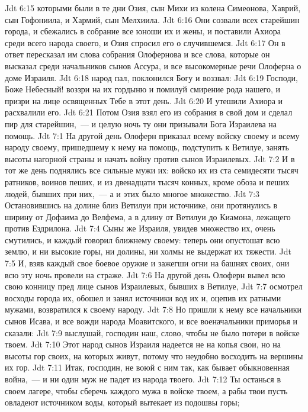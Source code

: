 \vs Jdt 6:15 которыми были в те дни Озия, сын Михи из колена Симеонова, Хаврий, сын Гофониила, и Хармий, сын Мелхиила.
\vs Jdt 6:16 Они созвали всех старейшин города, и сбежались в собрание все юноши их и жены, и поставили Ахиора среди всего народа своего, и Озия спросил его о случившемся.
\vs Jdt 6:17 Он в ответ пересказал им слова собрания Олофернова и все слова, которые он высказал среди начальников сынов Ассура, и все высокомерные речи Олоферна о доме Израиля.
\vs Jdt 6:18  народ пал, поклонился Богу и воззвал:
\vs Jdt 6:19 Господи, Боже Небесный! воззри на их гордыню и помилуй смирение рода нашего, и призри на лице освященных Тебе в этот день.
\vs Jdt 6:20 И утешили Ахиора и расхвалили его.
\vs Jdt 6:21 Потом Озия взял его из собрания в свой дом и сделал пир для старейшин,~--- и целую ночь ту они призывали Бога Израилева на помощь.
\vs Jdt 7:1 На другой день Олоферн приказал всему войску своему и всему народу своему, пришедшему к нему на помощь, подступить к Ветилуе, занять высоты нагорной страны и начать войну против сынов Израилевых.
\vs Jdt 7:2 И в тот же день поднялись все сильные мужи их: войско их  из ста семидесяти тысяч ратников, воинов пеших, и из двенадцати тысяч конных, кроме обоза и пеших людей, бывших при них,~--- а и этих было многое множество.
\vs Jdt 7:3 Остановившись на долине близ Ветилуи при источнике, они протянулись в ширину от Дофаима до Велфема, а в длину от Ветилуи до Киамона, лежащего против Ездрилона.
\vs Jdt 7:4 Сыны же Израиля, увидев множество их, очень смутились, и каждый говорил ближнему своему: теперь они опустошат всю землю, и ни высокие горы, ни долины, ни холмы не выдержат их тяжести.
\vs Jdt 7:5 И, взяв каждый свое боевое оружие и зажегши огни на башнях своих, они всю эту ночь провели на страже.
\rsbpar\vs Jdt 7:6 На другой день Олоферн вывел всю свою конницу пред лице сынов Израилевых, бывших в Ветилуе,
\vs Jdt 7:7 осмотрел восходы города их, обошел и занял источники вод их и, оцепив их ратными мужами, возвратился к своему народу.
\vs Jdt 7:8 Но пришли к нему все начальники сынов Исава, и все вожди народа Моавитского, и все военачальники приморья и сказали:
\vs Jdt 7:9 выслушай, господин наш, слово, чтобы не было потери в войске твоем.
\vs Jdt 7:10 Этот народ сынов Израиля надеется не на копья свои, но на высоты гор своих, на которых живут, потому что неудобно восходить на вершины их гор.
\vs Jdt 7:11 Итак, господин, не воюй с ним так, как бывает обыкновенная война,~--- и ни один муж не падет из народа твоего.
\vs Jdt 7:12 Ты останься в своем лагере, чтобы сберечь каждого мужа в войске твоем, а рабы твои пусть овладеют источником воды, который вытекает из подошвы горы;
